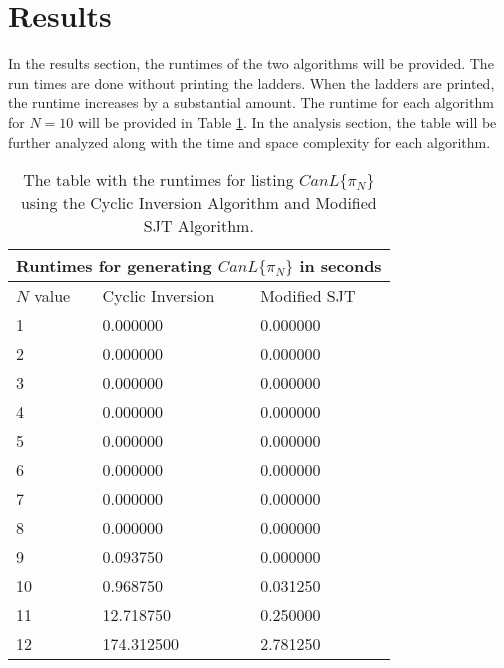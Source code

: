 \section{Results}
    In the results section, the runtimes of the two algorithms will be provided. The run times are done without printing the ladders. When the ladders are printed, the runtime increases by a substantial amount. 
    The runtime for each algorithm for $N=10$ will be provided in Table \ref{Table:ListingResults}. In the analysis section, the table will be further analyzed along with 
    the time and space complexity for each algorithm.
    \begin{table}
    \begin{tabular}{ |p{3cm}||p{3cm}|p{3cm}|}
        \hline
        \multicolumn{3}{|c|}{Runtimes for generating $CanL\{\pi_{N}\}$ in seconds} \\
        \hline
            $N$ value& Cyclic Inversion & Modified SJT\\
        \hline
            1   & 0.000000    &0.000000\\
            \hline
            2 &   0.000000  & 0.000000\\

            \hline
            3 &0.000000 & 0.000000\\
            \hline
            4 &0.000000 & 0.000000\\
            \hline
            5 &   0.000000  & 0.000000\\
            \hline
            6 & 0.000000  & 0.000000  \\
            \hline
            7 & 0.000000  & 0.000000\\
            \hline
            8 & 0.000000 & 0.000000\\
            \hline
            9 & 0.093750 & 0.000000\\
            \hline
            10 & 0.968750 & 0.031250\\
            \hline

            11 & 12.718750 & 0.250000\\
            \hline 
            12 & 174.312500 & 2.781250\\
        \hline
    \end{tabular}
    \caption{The table with the runtimes for listing $CanL\{\pi_{N}\}$ using the Cyclic Inversion Algorithm and Modified SJT Algorithm.}
    \label{Table:ListingResults}
    \end{table}\pagebreak